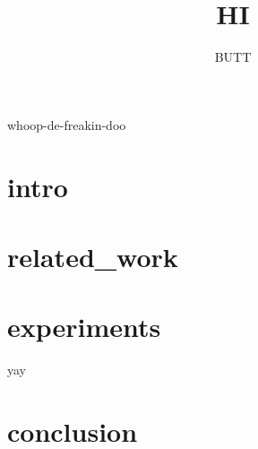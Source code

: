 \documentclass{IEEEtran}
\title{HI}
\author{BUTT}
\begin{document}
whoop-de-freakin-doo
\section{intro}
\section{related_work}
\section{experiments}
\begin{center}
 yay
\end{center}
\section{conclusion}
\end{document}
